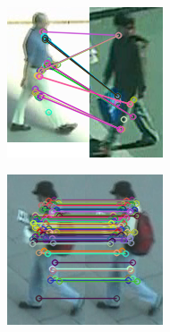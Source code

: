\begin{figure}[!h]
\begin{subfigure}[!h]{0.24\textwidth}
	\end{subfigure}
	\begin{subfigure}[!h]{0.24\textwidth}
		\includegraphics[width=\linewidth]{images/recognition/kpSample_aLotofMatches}
	\end{subfigure}
	\begin{subfigure}[!h]{0.24\textwidth}
		\includegraphics[width=\linewidth]{images/recognition/kpSample_self}

\end{subfigure}
\end{figure}
